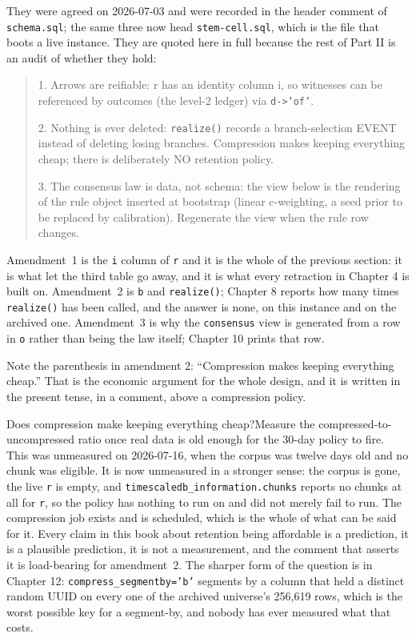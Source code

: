 They were agreed on 2026-07-03 and were recorded in the header comment of \texttt{schema.sql}; the same three now head \texttt{stem-cell.sql}, which is the file that boots a live instance. They are quoted here in full because the rest of Part II is an audit of whether they hold:

\begin{quote}
1. Arrows are reifiable: r has an identity column i, so witnesses can be referenced by outcomes (the level-2 ledger) via \texttt{d->'of'}.

2. Nothing is ever deleted: \texttt{realize()} records a branch-selection EVENT instead of deleting losing branches. Compression makes keeping everything cheap; there is deliberately NO retention policy.

3. The consensus law is data, not schema: the view below is the rendering of the rule object inserted at bootstrap (linear c-weighting, a seed prior to be replaced by calibration). Regenerate the view when the rule row changes.
\end{quote}

Amendment~1 is the \texttt{i} column of \texttt{r} and it is the whole of the previous section: it is what let the third table go away, and it is what every retraction in Chapter 4 is built on. Amendment~2 is \texttt{b} and \texttt{realize()}; Chapter 8 reports how many times \texttt{realize()} has been called, and the answer is none, on this instance and on the archived one. Amendment~3 is why the \texttt{consensus} view is generated from a row in \texttt{o} rather than being the law itself; Chapter 10 prints that row.

Note the parenthesis in amendment 2: ``Compression makes keeping everything cheap.'' That is the economic argument for the whole design, and it is written in the present tense, in a comment, above a compression policy.

\begin{Open}{Does compression make keeping everything cheap?}{Measure the compressed-to-uncompressed ratio once real data is old enough for the 30-day policy to fire.}
This was unmeasured on 2026-07-16, when the corpus was twelve days old and no chunk was eligible. It is now unmeasured in a stronger sense: the corpus is gone, the live \texttt{r} is empty, and \texttt{timescaledb\_information.chunks} reports no chunks at all for \texttt{r}, so the policy has nothing to run on and did not merely fail to run. The compression job exists and is scheduled, which is the whole of what can be said for it. Every claim in this book about retention being affordable is a prediction, it is a plausible prediction, it is not a measurement, and the comment that asserts it is load-bearing for amendment~2. The sharper form of the question is in Chapter 12: \texttt{compress\_segmentby='b'} segments by a column that held a distinct random UUID on every one of the archived universe's 256,619 rows, which is the worst possible key for a segment-by, and nobody has ever measured what that costs.
\end{Open}

